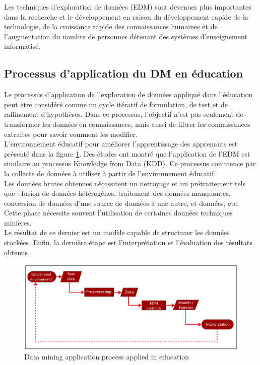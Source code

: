     Les techniques d'exploration de données (EDM) sont devenues plus importantes dans la recherche et le développement en raison du développement rapide de la technologie, de la croissance rapide des connaissances humaines et de l'augmentation du nombre de personnes détenant des systèmes d'enseignement informatisé. \\
    
    \subsection{Processus d'application du DM en éducation}
    Le processus d'application de l'exploration de données appliqué dans l'éducation peut être considéré comme
    un cycle itératif de formulation, de test et de raffinement d'hypothèses. Dans ce processus, l'objectif n'est pas seulement de transformer les données en connaissances, mais aussi de filtrer les connaissances extraites pour savoir comment les modifier. \\
    L’environnement éducatif pour améliorer l’apprentissage des apprenants est présenté dans la figure \ref{dataMiningProcess}. Des études ont montré que l'application de l'EDM est similaire au processus Knowledge from Data (KDD). Ce processus commence par la collecte de données à utiliser à partir de l'environnement éducatif. \\
    Les données brutes obtenues nécessitent un nettoyage et un prétraitement tels que : fusion de données hétérogènes, traitement des données manquantes, conversion de données d'une source de données à une autre, et données, etc. Cette phase nécessite souvent l'utilisation de certaines données techniques minières. \\
    Le résultat de ce dernier est un modèle capable de structurer les données stockées. Enfin, la dernière étape est l'interprétation et l'évaluation des résultats obtenus \cite{dm_tuteurs}.

    \begin{figure}[H]
		\begin{center}
			\includegraphics[width=\textwidth]{images/chapitre1/Data mining application process applied in education}
		\end{center}
    \caption{Data mining application process applied in education}
    \label{dataMiningProcess}
    \end{figure}

